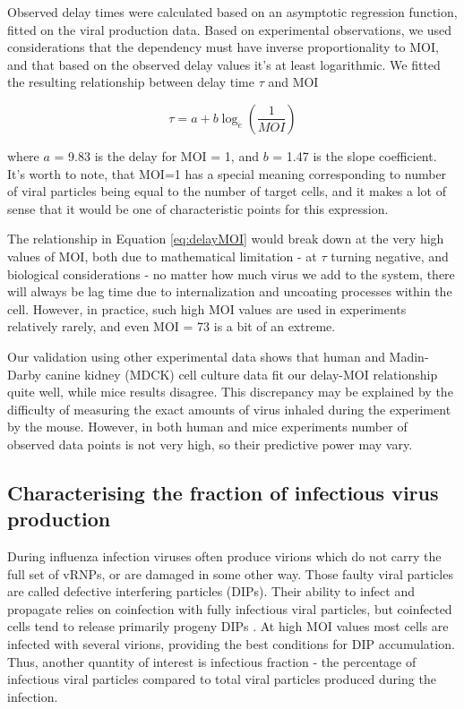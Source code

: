 Observed delay times were calculated based on an asymptotic regression function, fitted on the viral production data. Based on experimental observations, we used considerations that the dependency must have inverse proportionality to MOI, and that based on the observed delay values it's at least logarithmic. We fitted the resulting relationship between delay time $\tau$ and MOI 

\begin{equation}
\tau = a + b \log_e (\frac{1}{MOI})
\label{eq:delayMOI}
\end{equation}

where $a$ = 9.83 is the delay for MOI = 1, and $b$ = 1.47 is the slope coefficient. It's worth to note, that MOI=1 has a special meaning corresponding to number of viral particles being equal to the number of target cells, and it makes a lot of sense that it would be one of characteristic points for this expression.

The relationship in Equation \ref{eq:delayMOI} would break down at the very high values of MOI, both due to mathematical limitation - at $\tau$ turning negative, and biological considerations - no matter how much virus we add to the system, there will always be lag time due to internalization and uncoating processes within the cell. However, in practice, such high MOI values are used in experiments relatively rarely, and even MOI = 73 is a bit of an extreme.

Our validation using other experimental data shows that human and Madin-Darby canine kidney (MDCK) cell culture data fit our delay-MOI relationship quite well, while mice results disagree. This discrepancy may be explained by the difficulty of measuring the exact amounts of virus inhaled during the experiment by the mouse. However, in both human and mice experiments number of observed data points is not very high, so their predictive power may vary.

\subsection{Characterising the fraction of infectious virus production}

During influenza infection viruses often produce virions which do not carry the full set of vRNPs, or are damaged in some other way. Those faulty viral particles are called defective interfering particles (DIPs). Their ability to infect and propagate relies on coinfection with fully infectious viral particles, but coinfected cells tend to release primarily progeny DIPs \cite{frensing2014impact}. At high MOI values most cells are infected with several virions, providing the best conditions for DIP accumulation. Thus, another quantity of interest is infectious fraction - the percentage of infectious viral particles compared to total viral particles produced during the infection.

